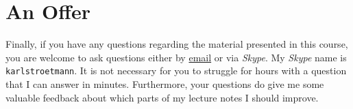 \section{An Offer}
Finally, if you have any questions regarding the material presented in this course, you are
welcome to ask questions either by \href{mailto:karl.stroetmann@dhbw-mannheim.de}{email} or via
\textsl{Skype}.  My \textsl{Skype} name is \texttt{karlstroetmann}.  It is not necessary for you to
struggle for hours with a question that I can answer in minutes.  Furthermore, your questions do
give me some valuable feedback about which parts of my lecture notes I should improve.


